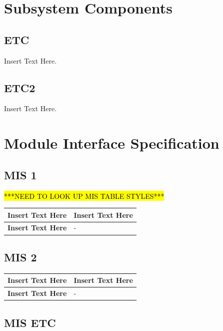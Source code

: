 \documentclass [11pt]{article}
\begin{document}


\section{Subsystem Components}

\subsection{ETC}
Insert Text Here. 

\subsection{ETC2}
Insert Text Here. 





\section{Module Interface Specification}
\subsection {MIS 1}

\hl{***NEED TO LOOK UP MIS TABLE STYLES***}

\begin{longtable}{| p{ } | p{ } | }\hline 
\textbf{Insert Text Here} & \textbf{Insert Text Here} \\ \hline
\textbf{Insert Text Here} & -\\ \hline 
\end{longtable}


\subsection {MIS 2 }

\begin{longtable}{| p{ } | p{ } | }\hline 
\textbf{Insert Text Here} & \textbf{Insert Text Here} \\ \hline
\textbf{Insert Text Here} & -\\ \hline 
\end{longtable}


\subsection {MIS ETC}
\end{document}
